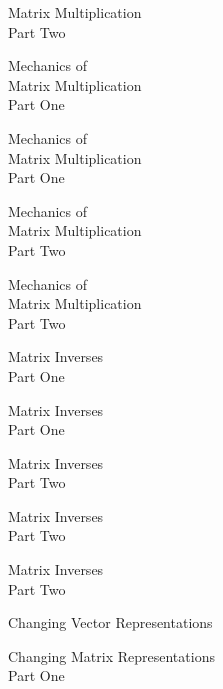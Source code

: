 \documentclass{titlescreen}
\begin{document}
\begin{videotitle}
  Matrix Multiplication  \\[1ex]
  Part Two
\end{videotitle}
\begin{videoend}
  Mechanics of \\[0.5ex]
  Matrix Multiplication  \\[1ex]
  Part One
\end{videoend}

\begin{videotitle}
  Mechanics of \\[0.5ex]
  Matrix Multiplication  \\[1ex]
  Part One
\end{videotitle}
\begin{videoend}
  Mechanics of \\[0.5ex]
  Matrix Multiplication  \\[1ex]
  Part Two
\end{videoend}

\begin{videotitle}
  Mechanics of \\[0.5ex]
  Matrix Multiplication  \\[1ex]
  Part Two
\end{videotitle}
\begin{videoend}
  Matrix Inverses  \\[1ex]
  Part One
\end{videoend}

\begin{videotitle}
  Matrix Inverses  \\[1ex]
  Part One
\end{videotitle}
\begin{videoend}
  Matrix Inverses  \\[1ex]
  Part Two
\end{videoend}

\begin{videotitle}
  Matrix Inverses  \\[1ex]
  Part Two
\end{videotitle}
\begin{videoend}
  Matrix Inverses  \\[1ex]
  Part Two
\end{videoend}


\begin{videotitle}
  Changing Vector Representations
\end{videotitle}
\begin{videoend}
  Changing Matrix Representations \\[1ex]
  Part One
\end{videoend}
\end{document}
